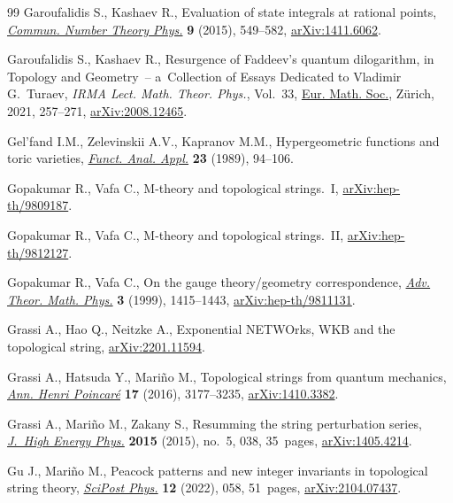 \documentclass[pdftex]{sigma}
\numberwithin{equation}{section}
\begin{document}
\begin{thebibliography}{99}
Garoufalidis S., Kashaev R., Evaluation of state integrals at rational points,
 \href{https://doi.org/10.4310/CNTP.2015.v9.n3.a3}{\textit{Commun. Number Theory Phys.}} \textbf{9} (2015), 549--582,
 \href{https://arxiv.org/abs/1411.6062}{arXiv:1411.6062}.

Garoufalidis S., Kashaev R., Resurgence of {F}addeev's quantum dilogarithm, in
 Topology and Geometry~-- a~Collection of Essays Dedicated to {V}ladimir
 {G}.~{T}uraev, \textit{IRMA Lect. Math. Theor. Phys.}, Vol.~33, \href{https://doi.org/10.4171/IRMA/33-1/14}{Eur. Math.
 Soc.}, Z\"urich, 2021, 257--271, \href{https://arxiv.org/abs/2008.12465}{arXiv:2008.12465}.

Gel'fand I.M., Zelevinskii A.V., Kapranov M.M., Hypergeometric functions and
 toric varieties, \href{https://doi.org/10.1007/BF01078777}{\textit{Funct. Anal. Appl.}} \textbf{23} (1989), 94--106.

Gopakumar R., Vafa C., {M}-theory and topological strings.~{I},
 \href{https://arxiv.org/abs/hep-th/9809187}{arXiv:hep-th/9809187}.

Gopakumar R., Vafa C., {M}-theory and topological strings.~{II},
 \href{https://arxiv.org/abs/hep-th/9812127}{arXiv:hep-th/9812127}.

Gopakumar R., Vafa C., On the gauge theory/geometry correspondence,
 \href{https://doi.org/10.4310/ATMP.1999.v3.n5.a5}{\textit{Adv. Theor. Math. Phys.}} \textbf{3} (1999), 1415--1443,
 \href{https://arxiv.org/abs/hep-th/9811131}{arXiv:hep-th/9811131}.

Grassi A., Hao Q., Neitzke A., Exponential NETWOrks, {WKB} and the topological
 string, \href{https://arxiv.org/abs/2201.11594}{arXiv:2201.11594}.

Grassi A., Hatsuda Y., Mari\~no M., Topological strings from quantum mechanics,
 \href{https://doi.org/10.1007/s00023-016-0479-4}{\textit{Ann. Henri Poincar\'e}} \textbf{17} (2016), 3177--3235,
 \href{https://arxiv.org/abs/1410.3382}{arXiv:1410.3382}.

Grassi A., Mari\~no M., Zakany S., Resumming the string perturbation series,
 \href{https://doi.org/10.1007/JHEP05(2015)038}{\textit{J.~High Energy Phys.}} \textbf{2015} (2015), no.~5, 038, 35~pages,
 \href{https://arxiv.org/abs/1405.4214}{arXiv:1405.4214}.

Gu J., Mari\~no M., Peacock patterns and new integer invariants in topological
 string theory, \href{https://doi.org/10.21468/scipostphys.12.2.058}{\textit{SciPost Phys.}} \textbf{12} (2022), 058, 51~pages,
 \href{https://arxiv.org/abs/2104.07437}{arXiv:2104.07437}.


\end{thebibliography}
\end{document}
